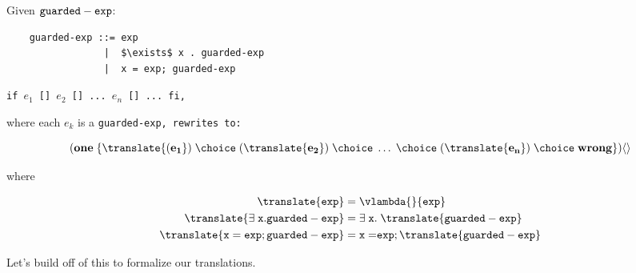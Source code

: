 \documentclass[]{article}
\begin{document}
Given $\tt{guarded-exp}$:

\begin{lstlisting}
    guarded-exp ::= exp
                 |  $\exists$ x . guarded-exp
                 |  x = exp; guarded-exp

\end{lstlisting}

\tt{if $e_1$ [] $e_2$ [] ... $e_n$ [] ... fi},

where each $e_k$ is a \tt{guarded-exp}, rewrites to: 

$$
(\bf{one} \; \{\translate{(e_{1}})
\; \choice \; (\translate{e_{2}}) 
\; \choice \; \dots \; \choice \; 
(\translate{e_{n}}) 
\; \choice \; \bf{wrong} \})
 \langle\rangle  \\
$$  

where

\begin{align}    
    \translate{\tt{exp}} &= \vlambda{}{\tt{exp}} \\
    \translate{\exists \; \tt{x.guarded-exp}} 
    &= \exists \; \tt{x.} \; \translate{\tt{guarded-exp}} \\
    \translate{\tt{x = exp; guarded-exp}} 
    &= \tt{x = } \tt{exp}; \translate{\tt{guarded-exp}}
\end{align}

Let's build off of this to formalize our translations. 
\end{document}
